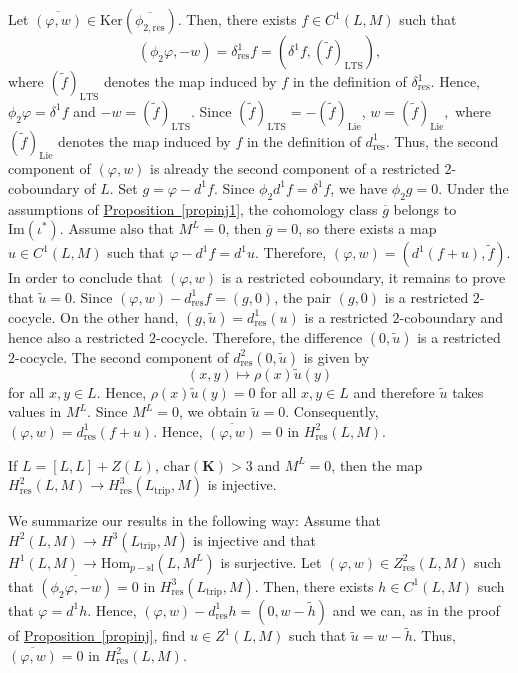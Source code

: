 \documentclass[11pt, twoside]{article}
\begin{document}
Let $\overline{(\varphi,w)}\in \mathrm{Ker}(\overline{\phi_{2,\mathrm{res}}}) $. Then, there exists $f\in C^1(L,M)$ such that $$(\phi_2\varphi,-w)=\delta^1_\mathrm{res}f=(\delta^1f,(\tilde{f})_\mathrm{LTS}), $$ where $(\tilde{f})_\mathrm{LTS} $ denotes the map induced by $f$ in the definition of $\delta^1_\mathrm{res} $. Hence, $\phi_2\varphi=\delta^1f $ and $-w=(\tilde{f})_\mathrm{LTS} $. Since $(\tilde{f})_\mathrm{LTS}=-(\tilde{f})_\mathrm{Lie} $, $w=(\tilde{f})_\mathrm{Lie} ,$ where $(\tilde{f})_\mathrm{Lie}$ denotes the map induced by $f$ in the definition of $d^1_\mathrm{res}$. Thus, the second component of $(\varphi,w) $ is already the second component of a restricted $2$-coboundary of $L$. Set $g=\varphi-d^1f $. Since $\phi_2d^1f=\delta^1f $, we have $\phi_2g=0 $. Under the assumptions of \hyperref[propinj1]{Proposition~\ref*{propinj1}}, the cohomology class $\overline{g} $ belongs to $\mathrm{Im}(\iota^*)$. Assume also that $M^L=0 $, then $\overline{g}=0$, so there exists a map $u\in C^1(L,M) $ such that $\varphi-d^1f=d^1u $. Therefore, $(\varphi,w)= (d^1(f+u),\tilde{f}) $. In order to conclude that $(\varphi,w) $ is a restricted coboundary, it remains to prove that $\tilde{u}=0 $. Since $(\varphi,w) - d^1_\mathrm{res}f=(g,0) $, the pair $(g,0)$ is a restricted $2$-cocycle. On the other hand, $(g,\tilde{u})=d^1_\mathrm{res}(u) $ is a restricted $2$-coboundary and hence also a restricted $2$-cocycle. Therefore, the difference $(0,\tilde{u}) $ is a restricted $2$-cocycle. The second component of $d^2_\mathrm{res}(0,\tilde{u}) $ is given by $$(x,y)\mapsto\rho(x)\tilde{u}(y) $$ for all $x,y\in L $. Hence, $\rho(x)\tilde{u}(y)=0 $ for all $x,y\in L$ and therefore $\tilde{u} $ takes values in $M^L $. Since $M^L=0$, we obtain $\tilde{u}=0$. Consequently, $(\varphi,w)=d^1_\mathrm{res}(f+u)$. Hence, $\overline{(\varphi,w)}=0 $ in $H^2_\mathrm{res}(L,M)$.

\begin{prop}
     If $L=[L,L]+Z(L) $, $\mathrm{char}(\mathbf{K})> 3$ and $M^L=0$, then the map $H_\mathrm{res}^2(L,M)\to H_\mathrm{res}^3(L_\mathrm{trip},M)$ is injective.
\end{prop}

We summarize  our results in the following way: Assume that $H^2(L,M)\to H^3(L_\mathrm{trip},M) $ is injective and that $H^1(L,M)\to \mathrm{Hom}_{p-\mathrm{sl}}(L,M^L) $ is surjective. Let $(\varphi,w)\in Z^2_\mathrm{res}(L,M) $ such that $\overline{(\phi_2\varphi,-w)}=0 $ in $H^3_\mathrm{res}(L_\mathrm{trip},M)$. Then, there exists $h\in C^1(L,M) $ such that $\varphi=d^1h $. Hence, $(\varphi,w)-d^1_\mathrm{res}h=(0,w-\tilde{h}) $ and we can, as in the proof of \hyperref[propinj]{Proposition~\ref*{propinj}}, find $u\in Z^1(L,M) $ such that $\tilde{u}=w-\tilde{h} $. Thus, $\overline{(\varphi,w)}=0 $ in $H^2_\mathrm{res}(L,M)$.
\end{document}
